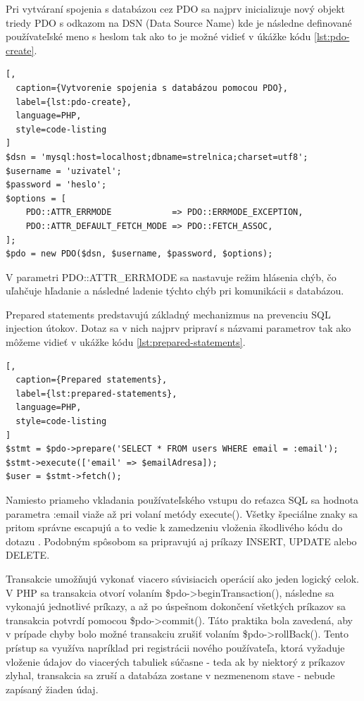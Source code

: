 Pri vytváraní spojenia s databázou cez PDO sa najprv inicializuje nový objekt triedy PDO s odkazom na DSN 
(Data Source Name) kde je následne definované používateľské meno s heslom tak ako to je možné vidieť v úkážke 
kódu \ref{lst:pdo-create}.

\begin{lstlisting}[,
  caption={Vytvorenie spojenia s databázou pomocou PDO},
  label={lst:pdo-create},
  language=PHP,
  style=code-listing
]
$dsn = 'mysql:host=localhost;dbname=strelnica;charset=utf8';
$username = 'uzivatel';
$password = 'heslo';
$options = [
    PDO::ATTR_ERRMODE            => PDO::ERRMODE_EXCEPTION,
    PDO::ATTR_DEFAULT_FETCH_MODE => PDO::FETCH_ASSOC,
];
$pdo = new PDO($dsn, $username, $password, $options);
\end{lstlisting}

V parametri PDO::ATTR\_ERRMODE sa nastavuje režim hlásenia chýb, čo uľahčuje hľadanie a následné ladenie týchto chýb pri 
komunikácii s databázou.  

Prepared statements predstavujú základný mechanizmus na prevenciu SQL injection útokov. Dotaz sa v nich najprv pripraví s 
názvami parametrov tak ako môžeme vidieť v ukážke kódu \ref{lst:prepared-statements}.

\begin{lstlisting}[,
  caption={Prepared statements},
  label={lst:prepared-statements},
  language=PHP,
  style=code-listing
]
$stmt = $pdo->prepare('SELECT * FROM users WHERE email = :email');
$stmt->execute(['email' => $emailAdresa]);
$user = $stmt->fetch();
\end{lstlisting}

Namiesto priameho vkladania používateľského vstupu do reťazca SQL sa hodnota parametra :email viaže až pri volaní 
metódy execute(). Všetky špeciálne znaky sa pritom správne escapujú a to vedie k zamedzeniu vloženia škodlivého 
kódu do dotazu \cite{owasp_sql_injection}. Podobným spôsobom sa pripravujú aj príkazy INSERT, UPDATE alebo DELETE.

Transakcie umožňujú vykonať viacero súvisiacich operácií ako jeden logický celok. V PHP sa transakcia otvorí volaním 
\$pdo->beginTransaction(), následne sa vykonajú jednotlivé príkazy, a až po úspešnom dokončení všetkých príkazov 
sa transakcia potvrdí pomocou \$pdo->commit(). Táto praktika bola zavedená, aby v prípade chyby bolo možné transakciu 
zrušiť volaním \$pdo->rollBack(). Tento prístup sa využíva napríklad pri registrácii nového používateľa, ktorá vyžaduje vloženie 
údajov do viacerých tabuliek súčasne - teda ak by niektorý z príkazov zlyhal, transakcia sa zruší a databáza zostane v 
nezmenenom stave - nebude zapísaný žiaden údaj.

